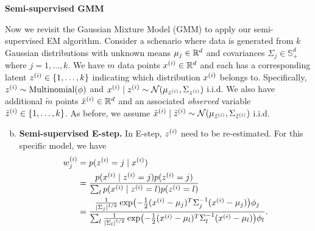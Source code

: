 \documentclass[12pt,letterpaper,boxed]{hmcpset}
\newcommand{\ww}{w^{(i)}}
\begin{document}
\begin{solution}
  \noindent \textbf{Semi-supervised GMM}

  \noindent Now we revisit the Gaussian Mixture Model (GMM) to apply our semi-supervised EM algorithm. Consider a schenario where data is generated from $k$ Gaussian distributions with unknown means $\mu_j \in \mathbb{R}^d$ and covariances $\Sigma_j \in \mathbb{S}_+^d$ where $j = 1, \dots, k$. We have $m$ data points $\xx \in \R^d$ and each has a corresponding latent $\zz \in \{1, \dots, k\}$ indicating which distribution $\xx$ belongs to. Specifically, $\zz \sim \text{Multinomial}(\phi)$ and $\xx \mid \zz \sim \mathcal{N}(\mu_{\zz}, \Sigma_{\zz})$ i.i.d. We also have additional $\tilde{m}$ points $\txx \in \R^d$ and an associated \emph{observed} variable $\tzz \in \{1, \dots, k\}$. As before, we assume $\txx \mid \tzz \sim \mathcal{N}(\mu_{\tzz}, \Sigma_{\tzz})$ i.i.d.

  \begin{enumerate}[(a)]
    \setcounter{enumi}{1}
    \item \textbf{Semi-supervised E-step.} In E-step, $\zz$ need to be re-estimated. For this specific model, we have
    \[
    \begin{aligned}
      \ww_j &= p(\zz = j \mid \xx) \\
      &= \frac{p(\xx \mid \zz = j) p(\zz = j)}{\sum_l p(\xx \mid \zz = l)p(\zz = l)} \\
      &= \frac{\frac{1}{\abs{\Sigma_j}^{1/2}} \exp(-\frac{1}{2} (\xx - \mu_j)^T \Sigma_j^{-1} (\xx - \mu_j)) \phi_j}{\sum_l \frac{1}{\abs{\Sigma_l}^{1/2}} \exp(-\frac{1}{2} (\xx - \mu_l)^T \Sigma_l^{-1} (\xx - \mu_l)) \phi_l}.
    \end{aligned}
    \]
  \end{enumerate}


\end{solution}
\end{document}
